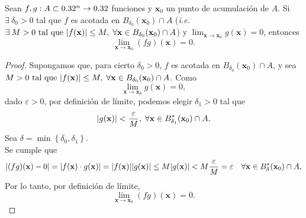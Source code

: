 \begin{propertie} \label{prop:cero_x_acotada}
 Sean $f, g : A \subset 0.32^n \to 0.32$ funciones y $\mathbf{x}_0$ un punto de acumulaci\'on de $A$. Si $\exists\: \delta_0 > 0$ tal que $f$ es acotada en $B_{\delta_0}(\mathbf{x}_0) \cap A$ (\textit{i.e.} $\exists\: M > 0 \text{ tal que } \abs{f(\mathbf{x})} \le M,\;\forall \mathbf{x} \in  B_{\delta_0}(\mathbf{x}_0) \cap A$) y $\lim_{\mathbf{x} \to \mathbf{x}_0}g(\mathbf{x}) = 0$, entonces
\[
 \lim_{\mathbf{x} \to \mathbf{x}_0}(f  g)(\mathbf{x}) = 0.
\]
\begin{proof}
\mbox{}

Supongamos que, para cierto $\delta_0 > 0$, $f$ es acotada en $B_{\delta_0}(\mathbf{x}_0) \cap A$, y sea $M > 0 \text{ tal que } \abs{f(\mathbf{x})} \le M, \; \forall \mathbf{x} \in  B_{\delta_0}(\mathbf{x}_0) \cap A$.
Como 
\[
\lim_{\mathbf{x} \to \mathbf{x}_0}g(\mathbf{x}) = 0, 
\]
dado $\varepsilon > 0 $, por definici\'on de l\'imite, podemos elegir $\delta_1 > 0$ tal que 
\[
 \abs{g(\mathbf{x})} < \frac{\varepsilon}{M},\;\forall \mathbf{x} \in  B^*_{\delta_1}(\mathbf{x}_0) \cap A.                                                                                               
\]
Sea $\delta = \min{ \left\{ \delta_0, \delta_1 \right\} }$. \\
Se cumple que
\[
 \abs{ (fg)(\mathbf{x}) - 0 } = \abs{ f(\mathbf{x}) \cdot g(\mathbf{x}) } = \abs{f(\mathbf{x})}\abs{g(\mathbf{x})} \le 
 M \abs{g(\mathbf{x})} < M \frac{\varepsilon}{M} = \varepsilon \quad \forall \mathbf{x} \in  B^*_{\delta}(\mathbf{x}_0) \cap A,
\]
Por lo tanto, por definici\'on de l\'imite,
\[
 \lim_{\mathbf{x} \to \mathbf{x}_0}(fg)(\mathbf{x}) = 0.
\]\end{proof}
\end{propertie}


